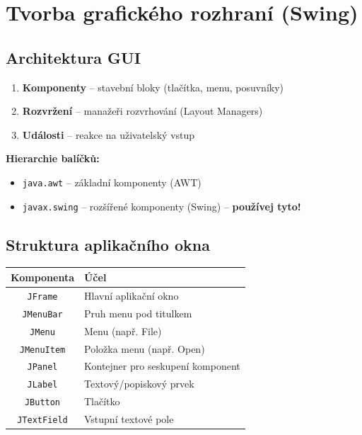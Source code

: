 \documentclass[11pt,a4paper]{article}
\begin{document}
\section{Tvorba grafického rozhraní (Swing)}

\subsection{Architektura GUI}

\begin{tcolorbox}[defbox,title=Tři pilíře GUI]
\begin{enumerate}
    \item \textbf{Komponenty} -- stavební bloky (tlačítka, menu, posuvníky)
    \item \textbf{Rozvržení} -- manažeři rozvrhování (Layout Managers)
    \item \textbf{Události} -- reakce na uživatelský vstup
\end{enumerate}
\end{tcolorbox}

\textbf{Hierarchie balíčků:}
\begin{itemize}
    \item \texttt{java.awt} -- základní komponenty (AWT)
    \item \texttt{javax.swing} -- rozšířené komponenty (Swing) -- \textbf{používej tyto!}
\end{itemize}

\subsection{Struktura aplikačního okna}

\begin{center}
\begin{tabular}{cl}
\toprule
\textbf{Komponenta} & \textbf{Účel} \\
\midrule
\texttt{JFrame} & Hlavní aplikační okno \\
\texttt{JMenuBar} & Pruh menu pod titulkem \\
\texttt{JMenu} & Menu (např. File) \\
\texttt{JMenuItem} & Položka menu (např. Open) \\
\texttt{JPanel} & Kontejner pro seskupení komponent \\
\texttt{JLabel} & Textový/popiskový prvek \\
\texttt{JButton} & Tlačítko \\
\texttt{JTextField} & Vstupní textové pole \\
\bottomrule
\end{tabular}
\end{center}
\end{document}
